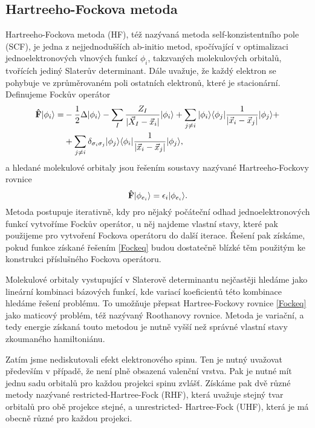 \subsection{Hartreeho-Fockova metoda}
Hartreeho-Fockova metoda (HF), též nazývaná metoda self-konzistentního pole (SCF), je 
jedna z 
nejjednodušších ab-initio metod, spočívající v optimalizaci jednoelektronových 
vlnových funkcí $\phi_{i}$, takzvaných molekulových orbitalů, tvořících jediný Slaterův 
determinant. Dále uvažuje, že každý elektron se pohybuje ve zprůměrovaném poli 
ostatních elektronů, které je stacionární.
Definujeme Fockův operátor
\begin{equation}
\begin{split}
\mathbf{\hat{F}}| \phi_{i} \rangle =& -\frac{1}{2}\Delta| \phi_{i} \rangle
-\sum_{I} \frac{Z_{I}}{|\vec{X}_I - \vec{x}_i|}| \phi_{i} \rangle
+ \sum_{j \neq i} | \phi_{i} \rangle\langle \phi_{j} | \frac{1}{|\vec{x}_i - \vec{x}_j|} | \phi_{j} \rangle
+\\
&+ \sum_{j \neq i} \delta_{\sigma_i \sigma_{j}}| \phi_{j} \rangle\langle \phi_{i} | \frac{1}{|\vec{x}_i - \vec{x}_j|} | \phi_{j} \rangle,
\end{split}
\end{equation} 
a hledané molekulové orbitaly jsou řešením soustavy nazývané Hartreeho-Fockovy rovnice
\begin{equation}
\mathbf{\hat{F}}| \phi_{e_i} \rangle = \epsilon_i | \phi_{e_i} \rangle.\label{Fockeq}
\end{equation}
Metoda postupuje iterativně, kdy pro nějaký počáteční odhad jednoelektronových funkcí 
vytvoříme Fockův operátor, u něj najdeme vlastní stavy, které pak použijeme pro 
vytvoření Fockova operátoru do další iterace.
Řešení pak získáme, pokud funkce získané řešením \eqref{Fockeq} budou dostatečně 
blízké 
těm použitým ke konstrukci příslušného Fockova operátoru.

Molekulové orbitaly vystupující v Slaterově determinantu nejčastěji hledáme jako 
lineární
kombinaci bázových funkcí, kde variací koeficientů této kombinace hledáme řešení 
problému.
To umožňuje přepsat Hartree-Fockovy rovnice \eqref{Fockeq} jako maticový problém, též 
nazývaný Roothanovy rovnice.
Metoda je variační, a tedy energie získaná touto metodou je nutně vyšší než 
správné vlastní stavy zkoumaného hamiltoniánu.

Zatím jsme nediskutovali efekt elektronového spinu. Ten je nutný uvažovat především v 
případě, že není plně obsazená valenční vrstva. Pak je nutné mít jednu sadu orbitalů pro 
každou projekci spinu zvlášť. Získáme 
pak dvě různé metody nazývané restricted-Hartree-Fock 
(RHF), která uvažuje stejný tvar orbitalů pro obě projekce stejné, a unrestricted-
Hartree-Fock (UHF), která je má obecně různé pro každou projekci.


